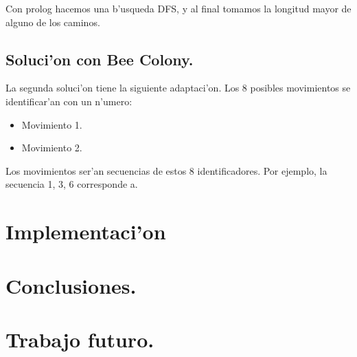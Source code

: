 \documentclass[12pt]{article}
\begin{document}
    Con prolog hacemos una b'usqueda DFS, y al final tomamos
    la longitud mayor de alguno de los caminos.

    \subsection{Soluci'on con Bee Colony.}

    La segunda soluci'on tiene la siguiente adaptaci'on.
    Los 8 posibles movimientos se identificar'an con un n'umero:
    \begin{itemize}
        \item Movimiento 1.
        \item Movimiento 2.
    \end{itemize}

    Los movimientos ser'an secuencias de estos 8 identificadores.
    Por ejemplo, la secuencia 1, 3, 6 corresponde a.
    \section{Implementaci'on}
    
    \section{Conclusiones.}

    \section{Trabajo futuro.}
\end{document}
